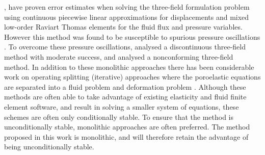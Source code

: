 \citet{phillips2007coupling,phillips2007couplingtwo}, have proven error estimates when solving the three-field formulation problem using continuous piecewise linear approximations for displacements and mixed low-order Raviart Thomas elements for the fluid flux and pressure variables. However this method was found to be susceptible to spurious pressure oscillations \citep[see,][]{phillips2009overcoming}. To overcome these pressure oscillations, \citet{li2012discontinuous} analysed a discontinuous three-field method with moderate success, and \citet{yi2013coupling} analysed a nonconforming three-field method.
In addition to these monolithic approaches there has been considerable work on operating splitting (iterative) approaches where the poroelastic equations are separated into a fluid problem and deformation problem \citep{wheeler2007iteratively,feng2010fully,kim2011stability}. Although these methods are often able to take advantage of existing elasticity and fluid finite element software, and result in solving a smaller system of equations, these schemes are often only conditionally stable. To ensure that the method is unconditionally stable, monolithic approaches are often preferred. The method proposed in this work is monolithic, and will therefore retain the advantage of being unconditionally stable.








